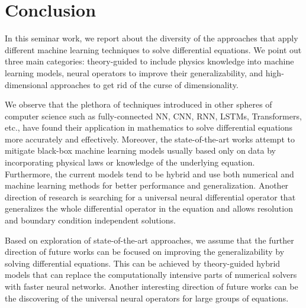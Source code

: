 \section{Conclusion}
\label{sec:conclusion}
In this seminar work, we report about the diversity of the approaches that apply different machine learning techniques to solve differential equations. We point out three main categories: theory-guided to include physics knowledge into machine learning models, neural operators to improve their generalizability, and high-dimensional approaches to get rid of the curse of dimensionality. 

We observe that the plethora of techniques introduced in other spheres of computer science such as fully-connected NN, CNN, RNN, LSTMs, Transformers, etc., have found their application in mathematics to solve differential equations more accurately and effectively. Moreover, the state-of-the-art works attempt to mitigate black-box machine learning models usually based only on data by incorporating physical laws or knowledge of the underlying equation. Furthermore, the current models tend to be hybrid and use both numerical and machine learning methods for better performance and generalization. Another direction of research is searching for a universal neural differential operator that generalizes the whole differential operator in the equation and allows resolution and boundary condition independent solutions.

Based on exploration of state-of-the-art approaches, we assume that the further direction of future works can be focused on improving the generalizability by solving differential equations. This can be achieved by theory-guided hybrid models that can replace the computationally intensive parts of numerical solvers with faster neural networks. Another interesting direction of future works can be the discovering of the universal neural operators for large groups of equations. 
